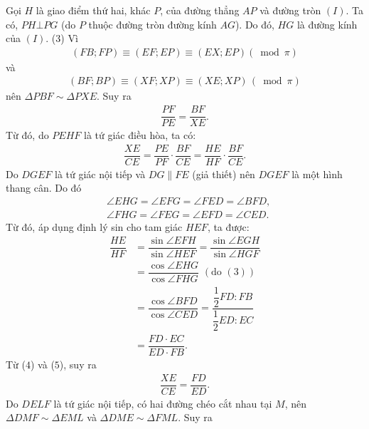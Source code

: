 \begin{multicols}{2}
	\vskip 0.05cm
	Gọi $H$ là giao điểm thứ hai, khác $P$, của đường thẳng $AP$ và đường tròn $(I)$. Ta có, $PH \bot PG$ (do $P$ thuộc đường tròn đường kính $AG$). Do đó, $HG$ là đường kính \linebreak của $(I)$. \hfill ($3$)
	\vskip 0.05cm
	Vì
	\begin{align*}
		\left( {FB;FP} \right) \equiv \left( {EF;EP} \right) \equiv \left( {EX;EP} \right)\left( {\bmod \pi } \right)
	\end{align*}
	và  
	\begin{align*}
		\left( {BF;BP} \right) \equiv \left( {XF;XP} \right) \equiv \left( {XE;XP} \right)\,\left( {\!\bmod \pi } \right)
	\end{align*}                                       
	nên $\Delta PBF \sim \Delta PXE$. Suy ra
	\begin{align*}
		\dfrac{{PF}}{{PE}} = \dfrac{{BF}}{{XE}}.
	\end{align*}
	Từ đó, do $PEHF$ là tứ giác điều hòa, ta có:
	\begin{align*}
		\dfrac{{XE}}{{CE}} = \dfrac{{PE}}{{PF}} \cdot \dfrac{{BF}}{{CE}} = \dfrac{{HE}}{{HF}} \cdot \dfrac{{BF}}{{CE}}. \tag{$4$}
	\end{align*}
	Do $DGEF$ là tứ giác nội tiếp và $DG \parallel FE$ (giả thiết) nên $DGEF$ là một hình thang cân. Do đó
	\begin{align*}
			&\angle EHG = \angle EFG = \angle FED = \angle BFD,\\
			&\angle FHG = \angle FEG = \angle EFD = \angle CED.
	\end{align*}
	Từ đó, áp dụng định lý sin cho tam giác $HEF$, ta được:
	\begin{align*}
		\dfrac{{HE}}{{HF}} &= \dfrac{{\sin \angle EFH}}{{\sin \angle HEF}} = \dfrac{{\sin \angle EGH}}{{\sin \angle HGF}} \\
		&= \dfrac{{\cos \angle EHG}}{{\cos \angle FHG}} \,\,({\text{do }}(3))\\
		&= \dfrac{{\cos \angle BFD}}{{\cos \angle CED}} = \dfrac{{\dfrac{1}{2}FD:FB}}{{\dfrac{1}{2}ED:EC}} \\
		&= \dfrac{{FD \cdot EC}}{{ED \cdot FB}}. \tag{$5$}
	\end{align*}
	Từ ($4$) và ($5$), suy ra
	\begin{align*}
		\dfrac{{XE}}{{CE}} = \dfrac{{FD}}{{ED}}. \tag{$6$}
	\end{align*}
	Do $DELF$ là tứ giác nội tiếp, có hai đường chéo cắt nhau tại $M$, nên $\Delta DMF \sim \Delta EML$ và $\Delta DME \sim \Delta FML$. Suy ra
	\begin{align*}

\end{align*}
\end{multicols}
